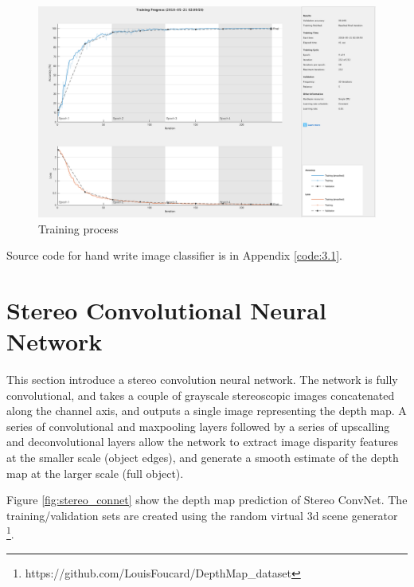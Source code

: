 \begin{figure}[h!]
	\centering
	\includegraphics[width=0.9\linewidth]{figures/part3/train}
	\caption{Training process}
	\label{fig:train}
\end{figure} 

Source code for hand write image classifier is in Appendix \ref{code:3.1}.

\section{Stereo Convolutional Neural Network}

This section introduce a stereo convolution neural network. The network is fully convolutional, and takes a couple of grayscale stereoscopic images concatenated along the channel axis, and outputs a single image representing the depth map. A series of convolutional and maxpooling layers followed by a series of upscalling and deconvolutional layers allow the network to extract image disparity features at the smaller scale (object edges), and generate a smooth estimate of the depth map at the larger scale (full object). 

Figure \ref{fig:stereo_connet} show the depth map prediction of Stereo ConvNet. The training/validation sets are created using the random virtual 3d scene generator \footnote{https://github.com/LouisFoucard/DepthMap\_dataset}.

